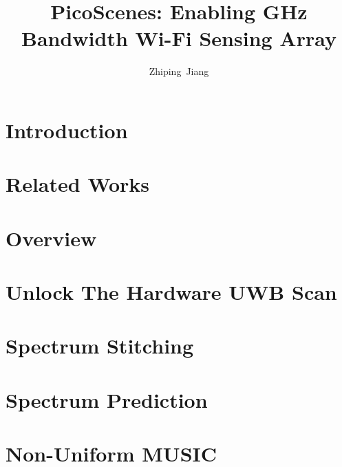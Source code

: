 \documentclass{sig-alternate-10pt}
\def\ourprotocol{{PicoScenes}\xspace}
\def\titletext{{\ourprotocol: Enabling GHz Bandwidth Wi-Fi Sensing Array}\xspace}
\begin{document}
\title{\titletext}

\author{Zhiping~Jiang}

\maketitle

\begin{abstract}

\end{abstract}

\section{Introduction} %
\label{sec:introduction}


\section{Related Works} %
\label{sec:related_works}


\section{Overview} %
\label{sec:overview}


\section{Unlock The Hardware UWB Scan} %
\label{sec:unlock_hardware_potentials}


\section{Spectrum Stitching} %
\label{sec:spectrum_stitching}


\section{Spectrum Prediction} %
\label{sec:spectrum_prediction}


\section{Non-Uniform MUSIC} %
\label{sec:non_uniform_music}

\end{document}
